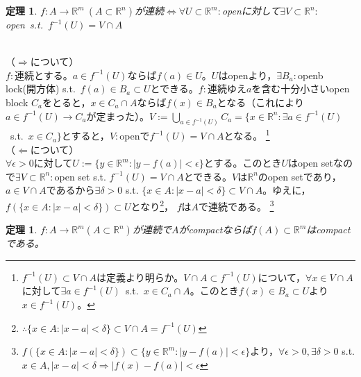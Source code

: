 \documentclass[dvipdfmx,a4j,10pt]{jsarticle}
\makeatletter
\theoremstyle{mystyle1}
\newtheorem{thm}[dfn]{定理}
\theoremstyle{mystyle2}
\renewenvironment{proof}[1][\proofname]{\par
  \pushQED{\qed}%
  \normalfont
  \topsep6\p@\@plus6\p@ \trivlist
  \item[\hskip\labelsep{\bfseries\sffamily #1}]\ignorespaces
}{%
  \popQED\endtrivlist\@endpefalse
}
\renewcommand\proofname{証明}
\makeatother
\begin{document}
\newpage

\begin{framed}
    \begin{thm}
        $f:A\to\mathbb{R}^m\ (A\subset\mathbb{R}^n)$が連続$\Leftrightarrow$$\forall U\subset \mathbb{R}^m:$openに対して$\exists V\subset\mathbb{R}^n:$open\ s.t.\ $f^{-1}(U)=V\cap A$\footnotemark
    \end{thm}
\end{framed}


\begin{proof}　\\
    （$\Rightarrow$について）\\
    $f:$連続とする。$a\in f^{-1}(U)$ならば$f(a)\in U$。$U$はopenより，$\exists B_a:$openb lock(開方体) s.t.\ $f(a)\in B_a\subset U$とできる。$f:$連続ゆえ$a$を含む十分小さいopen block $C_a$をとると，$x\in C_a\cap A$ならば$f(x)\in B_a$となる（これにより$a\in f^{-1}(U)\to C_a$が定まった）。$\displaystyle V:=\bigcup_{a\in f^{-1}(U)}C_a=\{x\in\mathbb{R}^n:\exists a\in f^{-1}(U)$\ s.t.\ $x\in C_a\}$とすると，$V:$openで$f^{-1}(U)=V\cap A$となる。
    \footnote{
    $f^{-1}(U)\subset V\cap A$は定義より明らか。$V\cap A\subset f^{-1}(U)$について，$\forall x\in V\cap A$に対して$\exists a\in f^{-1}(U)$\ s.t.\ $x\in C_a\cap A$。このとき$f(x)\in B_a\subset U$より$x\in f^{-1}(U)$。
    }
    \\
    （$\Leftarrow$について）\\
    $\forall\epsilon>0$に対して$U:=\{y\in\mathbb{R}^m:|y-f(a)| <\epsilon\}$とする。このとき$U$はopen setなので$\exists V\subset\mathbb{R}^n:$open set s.t. $f^{-1}(U)=V\cap A$とできる。$V$は$\mathbb{R}^n$のopen setであり，$a\in V\cap A$であるから$\exists\delta>0$ s.t. $\{x\in A:|x-a|<\delta\}\subset V\cap A$。ゆえに，$f(\{x\in A:|x-a|<\delta\})\subset U$となり\footnote{
    $\therefore\{x\in A:|x-a|<\delta\}\subset V\cap A=f^{-1}(U)$
    }，
    $f$は$A$で連続である。
    \footnote{
    $f(\{x\in A:|x-a|<\delta\})\subset\{y\in\mathbb{R}^m:|y-f(a)|<\epsilon\}$より，$\forall\epsilon>0,\exists\delta>0$ s.t. $x\in A,|x-a|<\delta\Rightarrow|f(x)-f(a)|<\epsilon$
    }
\end{proof}

\begin{framed}
    \begin{thm}\label{th1.9}
        $f:A\to\mathbb{R}^m(A\subset\mathbb{R}^n)$が連続で$A$がcompactならば$f(A)\subset\mathbb{R}^m$はcompactである。
    \end{thm}
\end{framed}
\end{document}
